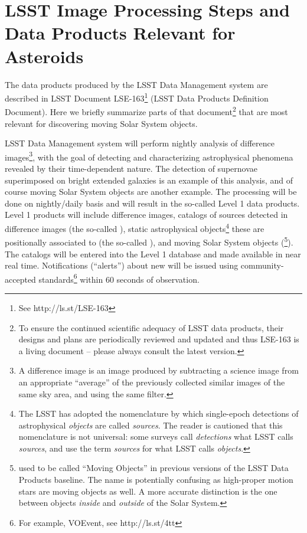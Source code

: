\section{LSST Image Processing Steps and Data Products Relevant for Asteroids} \label{sec:AppA}

The data products produced by the LSST Data Management system are described in
LSST Document LSE-163\footnote{See http://ls.st/LSE-163} (LSST Data Products
Definition Document). Here we briefly summarize parts of that
document\footnote{To ensure the continued scientific adequacy of LSST data
products, their designs and plans are periodically reviewed and updated and
thus LSE-163 is a living document -- please always consult the latest version.}
that are most relevant for discovering moving Solar System objects.

LSST Data Management system will perform nightly analysis of difference images\footnote{A difference
image is an image produced by subtracting a science image from an appropriate
``average'' of the previously collected similar images of the same sky area, and using the
same filter.}, with the goal of detecting and characterizing astrophysical phenomena
revealed by their time-dependent nature. The detection of supernovae superimposed
on bright extended galaxies is an example of this analysis, and of course moving Solar
System objects are another example. The processing will be done on nightly/daily
basis and will result in the so-called Level 1 data products. Level 1 products will include
difference images, catalogs of sources detected in difference images (the so-called
\DIASources), static astrophysical objects\footnote{The LSST has adopted the nomenclature by
which single-epoch detections of astrophysical {\em objects} are called {\em sources}.
The reader is cautioned that this nomenclature is not universal: some surveys call
{\em detections} what LSST calls {\em sources}, and use the term {\em sources} for what
LSST calls {\em objects}.} these \DIASources are positionally associated to (the so-called \DIAObjects),
and moving Solar System objects (\SSObjects\footnote{\SSObjects used to be called
``Moving Objects'' in previous versions of the LSST Data Products baseline. The name is
potentially confusing as high-proper motion stars are moving objects as well. A more
accurate distinction is the one between objects {\em inside} and {\em outside} of the Solar
System.}). The catalogs will be entered into the Level 1 database and made available in near
real time. Notifications (``alerts'') about new \DIASources will be issued using
community-accepted standards\footnote{For example, VOEvent, see http://ls.st/4tt} within
60 seconds of observation.

